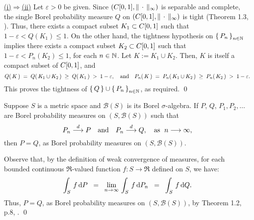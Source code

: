 \vskip 0.3cm
\noindent
\underline{(i)\;$\Longrightarrow$\;(ii)}
\vskip 0.2cm
\noindent
Let $\varepsilon > 0$ be given.
Since $\left(C[0,1],\Vert\,\cdot\,\Vert_{\infty}\right)$ is separable and complete,
the single Borel probability measure $Q$ on $\left(C[0,1],\Vert\,\cdot\,\Vert_{\infty}\right)$ is tight
(Theorem 1.3, \cite{Billingsley1999}).
Thus, there exists a compact subset $K_{1} \subset C[0,1]$ such that $1 - \varepsilon < Q(K_{1}) \leq 1$.
On the other hand, the tightness hypothesis on $\left\{\,P_{n}\,\right\}_{n\in\mathbb{N}}$ implies there exists
a compact subset $K_{2} \subset C[0,1]$ such that
$1 - \varepsilon < P_{n}(K_{2}) \leq 1$, for each $n \in \mathbb{N}$.
Let $K := K_{1} \cup K_{2}$. Then, $K$ is itself a compact subset of $C[0,1]$, and
\begin{equation*}
Q\!\left(\,K\,\right)
\;=\; Q\!\left(\,K_{1} \cup K_{2}\,\right)
\;\geq\; Q\!\left(\,K_{1}\,\right)
\;>\;1 - \varepsilon,
\quad\textnormal{and}\quad
P_{n}\!\left(\,K\,\right)
\;=\; P_{n}\!\left(\,K_{1} \cup K_{2}\,\right)
\;\geq\; P_{n}\!\left(\,K_{2}\,\right)
\;>\;1 - \varepsilon.
\end{equation*}
This proves the tightness of
$\left\{\,Q\,\right\}\cup\left\{\,P_{n}\,\right\}_{n\in\mathbb{N}}$,
as required.
\qed


\begin{theorem}
\label{weakLimitUniqueness}
\vskip 0.20cm
\noindent
Suppose $S$ is a metric space and $\mathcal{B}(S)$ is its Borel $\sigma$-algebra.
If $P$, $Q$, $P_{1}, P_{2}, \ldots\,$ are Borel probability measures on
$\left(S,\mathcal{B}(S)\right)$ such that
\begin{equation*}
P_{n} \overset{d}{\longrightarrow} P
\quad\textnormal{and}\quad
P_{n} \overset{d}{\longrightarrow} Q,
\quad
\textnormal{as \;$n \longrightarrow \infty$},
\end{equation*}
then $P = Q$, as Borel probability measures on $\left(S,\mathcal{B}(S)\right)$.
\end{theorem}
\proof
Observe that, by the definition of weak convergence of measures,
for each bounded continuous $\Re$-valued function
$f : S \longrightarrow \Re$ defined on $S$, we have:
\begin{equation*}
\int_{S}\,f\,\textnormal{d} P
\;\; = \;\; \underset{n\rightarrow\infty}{\lim}\,\int_{S}\,f\,\textnormal{d} P_{n}
\;\; = \;\; \int_{S}\,f\,\textnormal{d} Q.
\end{equation*}
Thus, $P = Q$, as Borel probability measures on $\left(S,\mathcal{B}(S)\right)$,
by Theorem 1.2, p.8, \cite{Billingsley1999}.
\qed


